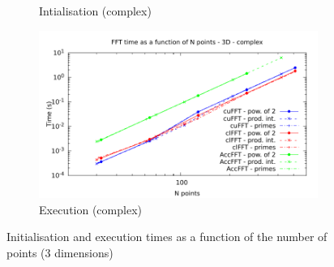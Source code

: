 \documentclass[12pt, a4paper]{article}
\begin{document}
\begin{figure}[H]
\begin{subfigure}{.5\textwidth}
\caption{Intialisation (complex)}
\label{FFT3DCI}
\end{subfigure}%
\begin{subfigure}{.5\textwidth}
\centering
\includegraphics[width=.9\linewidth]{graphs/fft-3d-c-exec.pdf}
\caption{Execution (complex)}
\label{FFT3DCE}
\end{subfigure}
\caption{Initialisation and execution times as a function of the number of points (3 dimensions)}
\label{FFT3D}
\end{figure}
\end{document}
